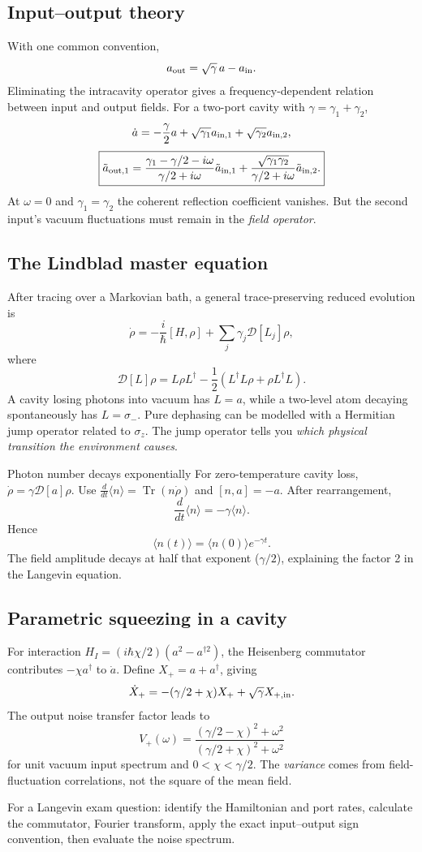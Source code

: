 \subsection{Input--output theory}
With one common convention,
\[
a_{\rm out}=\sqrt\gamma\,a-a_{\rm in}.
\]
Eliminating the intracavity operator gives
a frequency-dependent relation between
input and output fields. For a two-port
cavity with \(\gamma=\gamma_1+\gamma_2\),
\[
\dot a=-\frac\gamma2a+
\sqrt{\gamma_1}a_{{\rm in},1}
+\sqrt{\gamma_2}a_{{\rm in},2},
\]
\[
\boxed{
\tilde a_{{\rm out},1}
=\frac{\gamma_1-\gamma/2-i\omega}
{\gamma/2+i\omega}\tilde a_{{\rm in},1}
+\frac{\sqrt{\gamma_1\gamma_2}}
{\gamma/2+i\omega}\tilde a_{{\rm in},2}.}
\]
At \(\omega=0\) and \(\gamma_1=\gamma_2\)
the coherent reflection coefficient vanishes.
But the second input's vacuum fluctuations
must remain in the \emph{field operator}.

\subsection{The Lindblad master equation}
After tracing over a Markovian bath, a general
trace-preserving reduced evolution is
\[
\boxed{\dot\rho=-\frac{i}{\hbar}[H,\rho]+
\sum_j\gamma_j\mathcal D[L_j]\rho},
\]
where
\[
\mathcal D[L]\rho=L\rho L^\dagger
-\frac12(L^\dagger L\rho+\rho L^\dagger L).
\]
A cavity losing photons into vacuum has
\(L=a\), while a two-level atom decaying
spontaneously has \(L=\sigma_-\).
Pure dephasing can be modelled with a
Hermitian jump operator related to \(\sigma_z\).
The jump operator tells you \emph{which
physical transition the environment causes}.

\begin{worked}{Photon number decays exponentially}
For zero-temperature cavity loss,
\(\dot\rho=\gamma\mathcal D[a]\rho\).
Use \(\frac{d}{dt}\langle n\rangle
=\operatorname{Tr}(n\dot\rho)\) and
\([n,a]=-a\). After rearrangement,
\[
\frac{d}{dt}\langle n\rangle
=-\gamma\langle n\rangle.
\]
Hence
\[
\boxed{\langle n(t)\rangle
=\langle n(0)\rangle e^{-\gamma t}}.
\]
The field amplitude decays at half
that exponent (\(\gamma/2\)), explaining
the factor 2 in the Langevin equation.
\end{worked}

\subsection{Parametric squeezing in a cavity}
For interaction
\(H_I=(i\hbar\chi/2)(a^2-a^{\dagger2})\),
the Heisenberg commutator contributes
\(-\chi a^\dagger\) to \(\dot a\).
Define \(X_+=a+a^\dagger\), giving
\[
\dot X_+=-(\gamma/2+\chi)X_+
+\sqrt\gamma X_{+,\rm in}.
\]
The output noise transfer factor leads to
\[
\boxed{V_+(\omega)=
\frac{(\gamma/2-\chi)^2+\omega^2}
{(\gamma/2+\chi)^2+\omega^2}}
\]
for unit vacuum input spectrum and
\(0<\chi<\gamma/2\).
The \emph{variance} comes from
field-fluctuation correlations, not
the square of the mean field.

\begin{checkpoint}
For a Langevin exam question:
identify the Hamiltonian and port rates,
calculate the commutator, Fourier transform,
apply the exact input--output sign
convention, then evaluate the noise spectrum.
\end{checkpoint}

